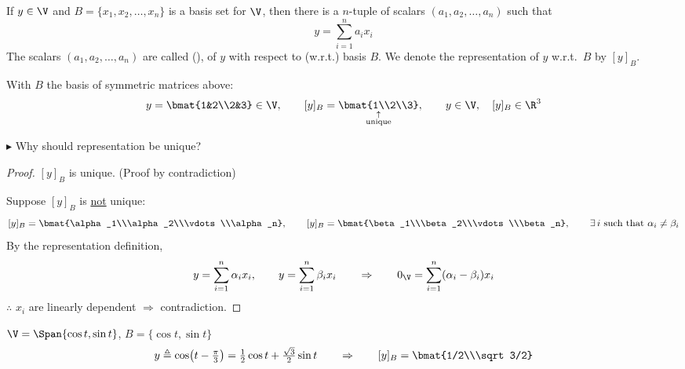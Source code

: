 \begin{definition}
If $y\in\V$ and $B=\{x_1,x_2,\dots,x_n\}$ is a basis set for $\V$, then there is a  $n$-tuple of scalars $(a_1,a_2,\dots,a_n)$ such that
\[ y = \sum_{i=1}^{n} a_ix_i \]
The scalars $(a_1,a_2,\dots,a_n)$ are called  (),  of $y$ with respect to (w.r.t.) basis $B$. We denote the representation of $y$ w.r.t.\ $B$ by $[y]_B$.
\end{definition}
With $B$ the basis of symmetric matrices above:
\[
y = \bmat{1&2\\2&3}\in\V, \qquad [y]_B = \underset{\substack{\uparrow\\\text{unique}}}{\bmat{1\\2\\3}}, \qquad y\in\V, \quad [y]_B\in\R^3
\]

$\blacktriangleright$ Why should representation be unique?
\begin{proof}
$[y]_B$ is unique. (Proof by contradiction)

Suppose $[y]_B$ is \underline{not} unique:
\[
[y]_B = \bmat{\alpha_1\\\alpha_2\\\vdots\\\alpha_n}, \qquad [y]_B = \bmat{\beta_1\\\beta_2\\\vdots\\\beta_n}, \qquad \exists\, i \text{ such that } \alpha_i\neq\beta_i
\]
By the representation definition,
\[
y = \sum_{i=1}^{n}\alpha_ix_i, \qquad y=\sum_{i=1}^{n}\beta_ix_i
\qquad\Rightarrow\qquad
0_{\V} = \sum_{i=1}^{n}(\alpha_i-\beta_i)x_i
\]
$\therefore$ $x_i$ are linearly dependent $\Rightarrow$ contradiction.
\end{proof}

\begin{example}
$\V = \Span\{\cos t,\sin t\}$, \quad $B = \{\cos t,\sin t\}$
\[
y \triangleq \cos\!\left(t-\tfrac{\pi}{3}\right) = \tfrac12\cos t+\tfrac{\sqrt3}{2}\sin t
\qquad\Rightarrow\qquad [y]_B = \bmat{1/2\\\sqrt3/2}
\]
\end{example}

